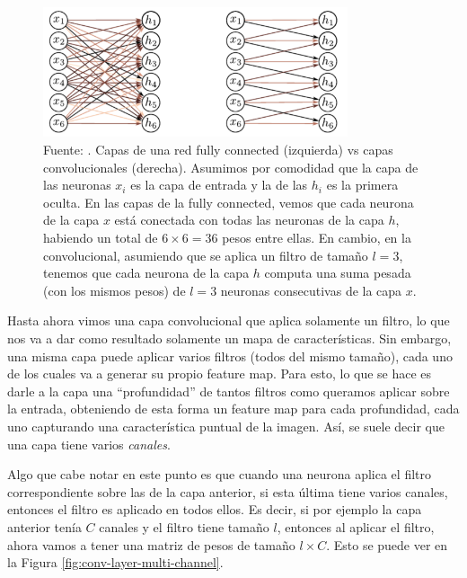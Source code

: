 \documentclass[../../main.tex]{subfiles}
\begin{document}
\begin{figure}
    \centering
    \includegraphics[width=0.8\textwidth]{figs/fully-connected-vs-conv.png}
    \caption{Fuente: \cite{prince2024understanding}. Capas de una red fully connected
    (izquierda) vs capas convolucionales (derecha). Asumimos por comodidad que la capa de
    las neuronas \(x_i\) es la capa de entrada y la de las \(h_i\) es la primera oculta.
    En las capas de la fully connected, vemos que cada neurona de la capa \(x\) está
    conectada con todas las neuronas de la capa \(h\), habiendo un total de \(6 \times 6 =
    36\) pesos entre ellas. En cambio, en la convolucional, asumiendo que se aplica
    un filtro de tamaño \(l=3\), tenemos que cada neurona de la capa \(h\) computa una
    suma pesada (con los mismos pesos) de \(l=3\) neuronas consecutivas de la capa \(x\).}
    \label{fig:fully-connected-vs-conv}
\end{figure}

Hasta ahora vimos una capa convolucional que aplica solamente un filtro, lo que nos va a
dar como resultado solamente un mapa de características. Sin embargo, una misma capa puede
aplicar varios filtros (todos del mismo tamaño), cada uno de los cuales va a generar su
propio feature map. Para esto, lo que se hace es darle a la capa una ``profundidad'' de
tantos filtros como queramos aplicar sobre la entrada, obteniendo de esta forma un feature
map para cada profundidad, cada uno capturando una característica puntual de la imagen.
Así, se suele decir que una capa tiene varios \textit{canales}.

Algo que cabe notar en este punto es que cuando una neurona aplica el filtro
correspondiente sobre las de la capa anterior, si esta última tiene varios canales,
entonces el filtro es aplicado en todos ellos. Es decir, si por ejemplo la capa anterior
tenía \(C\) canales y el filtro tiene tamaño \(l\), entonces al aplicar el filtro, ahora
vamos a tener una matriz de pesos de tamaño \(l \times C\). Esto se puede ver en la
Figura \ref{fig:conv-layer-multi-channel}.
\end{document}
